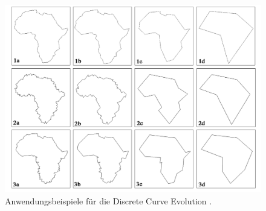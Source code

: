 {    \begin{figure}[ht]
        \centering
        \includegraphics*[scale = 0.65, keepaspectratio, trim=2 2 2 2 ]{images/DCE/schem_maps_paper_DCE.png}
        \caption[Anwendungsbeispiele für die \glqq Discrete Curve Evolution\grqq{}]{Anwendungsbeispiele für die \glqq Discrete Curve Evolution\grqq{}  \citep{Barkowsky2000}.}
        \label{Bsp_DCE_Bark_Paper}
    \end{figure}


}
